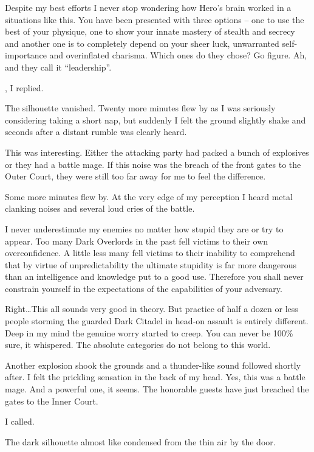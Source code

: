 Despite my best efforts I never stop wondering how Hero’s brain worked in a situations like this. You have been presented with three options – one to use the best of your physique, one to show your innate mastery of stealth and secrecy and another one is to completely depend on your sheer luck, unwarranted self-importance and overinflated charisma. Which ones do they chose? Go figure. Ah, and they call it “leadership”.

, I replied. 

The silhouette vanished. Twenty more minutes flew by as I was seriously considering taking a short nap, but suddenly I felt the ground slightly shake and seconds after a distant rumble was clearly heard.

This was interesting. Either the attacking party had packed a bunch of explosives or they had a battle mage. If this noise was the breach of the front gates to the Outer Court, they were still too far away for me to feel the difference.

Some more minutes flew by. At the very edge of my perception I heard metal clanking noises and several loud cries of the battle.

I never underestimate my enemies no matter how stupid they are or try to appear. Too many Dark Overlords in the past fell victims to their own overconfidence. A little less many fell victims to their inability to comprehend that by virtue of unpredictability the ultimate stupidity is far more dangerous than an intelligence and knowledge put to a good use. Therefore you shall never constrain yourself in the expectations of the capabilities of your adversary.

Right\dots This all sounds very good in theory. But practice of half a dozen or less people storming the guarded Dark Citadel in head-on assault is entirely different. Deep in my mind the genuine worry started to creep. You can never be 100\% sure, it whispered. The absolute categories do not belong to this world.

Another explosion shook the grounds and a thunder-like sound followed shortly after. I felt the prickling sensation in the back of my head. Yes, this was a battle mage. And a powerful one, it seems. The honorable guests have just breached the gates to the Inner Court.

 I called.

 The dark silhouette almost like condensed from the thin air by the door.

